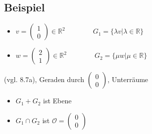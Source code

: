 \documentclass[12pt, titlepage]{article}
\newcommand{\R}{\mathds{R}}
\renewcommand{\vec}[1]{\left(\begin{array}{c}#1
	\end{array}\right)}
\renewcommand{\O}{\mathcal{O}}
\renewcommand{\>}{\rightarrow}
\renewcommand{\*}{\cdot}
\begin{document}
	\subsection{Beispiel}
	\begin{itemize}
		\item $v=\vec{1\\0}\in\R^2\qquad\qquad G_1=\{\lambda v|\lambda\in\R\}$
		\item $w=\vec{2\\1}\in\R^2\qquad\qquad G_2=\{\mu w|\mu\in\R\}$
	\end{itemize}
	(vgl. 8.7a), Geraden durch $\vec{0\\0}$, Unterräume
	\begin{itemize}
		\item $G_1+G_2$ ist Ebene
		\item $G_1\cap G_2$ ist $\O=\vec{0\\0}$
	\end{itemize}
\end{document}
